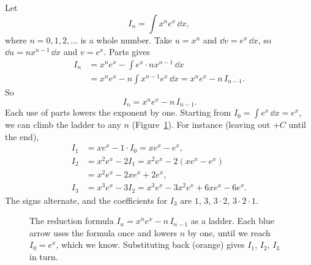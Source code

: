 \begin{example}
\label{ch23:ex-redxn}
Let
\[
I_n = \int x^n e^x\,\dd x,
\]
where $n = 0, 1, 2, \dots$ is a whole number.
Take $u = x^n$ and $\dd v = e^x\,\dd x$, so $\dd u = n x^{n-1}\,\dd x$ and
$v = e^x$. Parts gives
\begin{align*}
I_n &= x^n e^x - \int e^x \cdot n x^{n-1}\,\dd x\\
&= x^n e^x - n\int x^{n-1}e^x\,\dd x = x^n e^x - n\,I_{n-1}.
\end{align*}
So
\[
\boxed{\,I_n = x^n e^x - n\,I_{n-1}.}
\]
Each use of parts lowers the exponent by one. Starting from
$I_0 = \int e^x\,\dd x = e^x$, we can climb the ladder to any $n$
(Figure~\ref{ch23:fig-ladder}). For instance (leaving out $+C$ until the end),
\begin{align*}
I_1 &= x e^x - 1\cdot I_0 = xe^x - e^x,\\
I_2 &= x^2 e^x - 2 I_1 = x^2 e^x - 2(xe^x - e^x)\\
    &= x^2 e^x - 2x e^x + 2e^x,\\
I_3 &= x^3 e^x - 3 I_2 = x^3 e^x - 3x^2 e^x + 6x e^x - 6 e^x.
\end{align*}
The signs alternate, and the coefficients for $I_3$ are
$1$, $3$, $3\cdot 2$, $3\cdot 2\cdot 1$.
\end{example}

\begin{figure}[htbp]
\centering
{}
\caption{The reduction formula $I_n = x^n e^x - n\,I_{n-1}$ as a ladder. Each
blue arrow uses the formula once and lowers $n$ by one, until we reach
$I_0 = e^x$, which we know. Substituting back (orange) gives $I_1$, $I_2$, $I_3$
in turn.}
\label{ch23:fig-ladder}
\end{figure}

